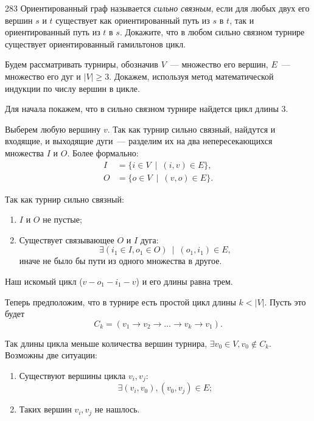 \begin{task}{283}
Ориентированный граф называется \textit{сильно связным}, если для любых двух его вершин \(s\) и \(t\) существует как ориентированный путь из \(s\) в \(t\), так и ориентированный путь из \(t\) в \(s\). Докажите, что в любом сильно связном турнире существует ориентированный гамильтонов цикл.
\end{task}

Будем рассматривать турниры, обозначив \(V\)~--- множество его вершин, \(E\)~--- множество его дуг и \(|V| \geqslant 3\). Докажем, используя метод математической индукции по числу вершин в цикле.

Для начала покажем, что в сильно связном турнире найдется цикл длины \(3\).

Выберем любую вершину \(v\). Так как турнир сильно связный, найдутся и входящие, и выходящие дуги~--- разделим их на два непересекающихся множества \(I\) и \(O\). Более формально:
\begin{align*}
    I &= \{i \in V\:\mid\:(i, v) \in E \},\\
    O &= \{o \in V\:\mid\:(v, o) \in E \}.
\end{align*}

Так как турнир сильно связный:
\begin{enumerate}
    \item \(I\) и \(O\) не пустые;
    
    \item Существует связывающее \(O\) и \(I\) дуга:
    \begin{equation*}
        \exists (i_1 \in I, o_1 \in O)\:\mid\:(o_1, i_1) \in E,
    \end{equation*}
    иначе не было бы пути из одного множества в другое.
\end{enumerate}

Наш искомый цикл (\(v - o_1 - i_1 - v\)) и его длины равна трем.

Теперь предположим, что в турнире есть простой цикл длины \(k < |V|\). Пусть это будет
\begin{equation*}
    C_k = (v_1 \rightarrow v_2 \rightarrow \ldots \rightarrow v_k \rightarrow v_1).
\end{equation*}

Так длины цикла меньше количества вершин турнира, \(\exists v_0 \in V, v_0 \notin C_k\). Возможны две ситуации:
\begin{enumerate}
    \item Существуют вершины цикла \(v_i, v_j\):
    \begin{equation*}
        \exists (v_i, v_0), (v_0, v_j) \in E;
    \end{equation*}
    
    \item Таких вершин \(v_i, v_j\) не нашлось.
\end{enumerate}

